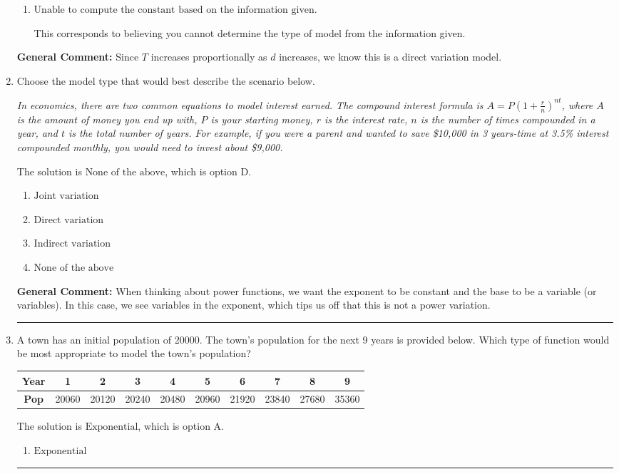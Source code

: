 \documentclass{extbook}[14pt]
\newcommand{\litem}[1]{\item #1

\rule{\textwidth}{0.4pt}}
\begin{document}
\begin{enumerate}
{\begin{enumerate}[label=\Alph*.]
* This is the correct option corresponding to the model $T^{4} = k d^{2}$.
\item \( \text{Unable to compute the constant based on the information given.} \)

This corresponds to believing you cannot determine the type of model from the information given.
\end{enumerate}

\textbf{General Comment:} Since $T$ increases proportionally as $d$ increases, we know this is a direct variation model.
}
\litem{
Choose the model type that would best describe the scenario below.

\begin{center}
    \textit{ In economics, there are two common equations to model interest earned. The compound interest formula is $A = P (1 + \frac{r}{n})^{nt}$, where $A$ is the amount of money you end up with, $P$ is your starting money, $r$ is the interest rate, $n$ is the number of times compounded in a year, and $t$ is the total number of years. For example, if you were a parent and wanted to save \$10,000 in 3 years-time at 3.5\% interest compounded monthly, you would need to invest about \$9,000. }
\end{center}
The solution is \( \text{None of the above} \), which is option D.\begin{enumerate}[label=\Alph*.]
\item \( \text{Joint variation} \)


\item \( \text{Direct variation} \)


\item \( \text{Indirect variation} \)


\item \( \text{None of the above} \)


\end{enumerate}

\textbf{General Comment:} When thinking about power functions, we want the exponent to be constant and the base to be a variable (or variables). In this case, we see variables in the exponent, which tips us off that this is not a power variation.
}
\litem{
A town has an initial population of 20000. The town's population for the next 9 years is provided below. Which type of function would be most appropriate to model the town's population?


\begin{tabular}{c|c|c|c|c|c|c|c|c|c}
\textbf{Year} &1 &2 &3 &4 &5 &6 &7 &8 &9\tabularnewline \hline
\textbf{Pop} &20060 &20120 &20240 &20480 &20960 &21920 &23840 &27680 &35360\end{tabular}The solution is \( \text{Exponential} \), which is option A.\begin{enumerate}[label=\Alph*.]
\item \( \text{Exponential} \)


\end{enumerate}}
\end{enumerate}
\end{document}
